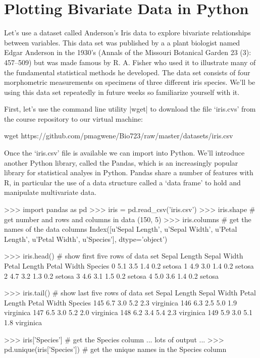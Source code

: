 \section{Plotting Bivariate Data in Python}


Let's use a dataset called Anderson's Iris data to explore bivariate relationships between variables. This data set was published by a a plant biologist named Edgar Anderson in the 1930's (Annals of the Missouri Botanical Garden 23 (3): 457–509) but was made famous by R. A. Fisher who used it to illustrate many of the fundamental statistical methods he developed. The data set consists of four morphometric measurements on specimens of three different iris species.  We'll be using this data set repeatedly in future weeks so familiarize yourself with it.

First, let's use the command line utility |wget| to download the file `iris.cvs' from the course repository to our virtual machine:
\begin{bash}
wget https://github.com/pmagwene/Bio723/raw/master/datasets/iris.csv
\end{bash}

Once the `iris.csv' file is available we can import into Python.  We'll introduce another Python library, called the Pandas, which is an increasingly popular library for statistical analyes in Python.  Pandas share a number of features with R, in particular the use of a data structure called a `data frame' to hold and manipulate multivariate data.
%
\begin{python}
>>> import pandas as pd
>>> iris = pd.read_csv('iris.csv')
>>> iris.shape  # get number and rows and columns in data
(150, 5)
>>> iris.columns  # get the names of the data columns
Index([u'Sepal Length', u'Sepal Width', u'Petal Length', u'Petal Width', u'Species'], dtype='object')

>>> iris.head()  # show first five rows of data set
   Sepal Length  Sepal Width  Petal Length  Petal Width Species
0           5.1          3.5           1.4          0.2  setosa
1           4.9          3.0           1.4          0.2  setosa
2           4.7          3.2           1.3          0.2  setosa
3           4.6          3.1           1.5          0.2  setosa
4           5.0          3.6           1.4          0.2  setosa

>>> iris.tail() # show last five rows of data set
     Sepal Length  Sepal Width  Petal Length  Petal Width    Species
145           6.7          3.0           5.2          2.3  virginica
146           6.3          2.5           5.0          1.9  virginica
147           6.5          3.0           5.2          2.0  virginica
148           6.2          3.4           5.4          2.3  virginica
149           5.9          3.0           5.1          1.8  virginica


>>> iris['Species']  # get the Species column
... lots of output ...
>>> pd.unique(iris['Species'])  # get the unique names in the Species column
\end{python}


